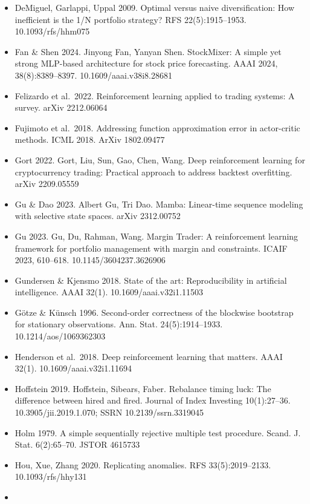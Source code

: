 \documentclass[12pt,a4paper]{report}
\begin{document}
\begin{itemize}
  Cuturi \& Blondel 2017. Soft-DTW: A differentiable loss function for
  time-series. ICML 2017, PMLR 70:894--903. arXiv 1703.01541
\item
  DeMiguel, Garlappi, Uppal 2009. Optimal versus naive diversification:
  How inefficient is the 1/N portfolio strategy? RFS 22(5):1915--1953.
  10.1093/rfs/hhm075
\item
  Fan \& Shen 2024. Jinyong Fan, Yanyan Shen. StockMixer: A simple yet
  strong MLP-based architecture for stock price forecasting. AAAI 2024,
  38(8):8389--8397. 10.1609/aaai.v38i8.28681
\item
  Felizardo et al.~2022. Reinforcement learning applied to trading
  systems: A survey. arXiv 2212.06064
\item
  Fujimoto et al.~2018. Addressing function approximation error in
  actor-critic methods. ICML 2018. ArXiv 1802.09477
\item
  Gort 2022. Gort, Liu, Sun, Gao, Chen, Wang. Deep reinforcement
  learning for cryptocurrency trading: Practical approach to address
  backtest overfitting. arXiv 2209.05559
\item
  Gu \& Dao 2023. Albert Gu, Tri Dao. Mamba: Linear-time sequence
  modeling with selective state spaces. arXiv 2312.00752
\item
  Gu 2023. Gu, Du, Rahman, Wang. Margin Trader: A reinforcement learning
  framework for portfolio management with margin and constraints. ICAIF
  2023, 610--618. 10.1145/3604237.3626906
\item
  Gundersen \& Kjensmo 2018. State of the art: Reproducibility in
  artificial intelligence. AAAI 32(1). 10.1609/aaai.v32i1.11503
\item
  Götze \& Künsch 1996. Second-order correctness of the blockwise
  bootstrap for stationary observations. Ann. Stat. 24(5):1914--1933.
  10.1214/aos/1069362303
\item
  Henderson et al.~2018. Deep reinforcement learning that matters. AAAI
  32(1). 10.1609/aaai.v32i1.11694
\item
  Hoffstein 2019. Hoffstein, Sibears, Faber. Rebalance timing luck: The
  difference between hired and fired. Journal of Index Investing
  10(1):27--36. 10.3905/jii.2019.1.070; SSRN 10.2139/ssrn.3319045
\item
  Holm 1979. A simple sequentially rejective multiple test procedure.
  Scand. J. Stat. 6(2):65--70. JSTOR 4615733
\item
  Hou, Xue, Zhang 2020. Replicating anomalies. RFS 33(5):2019--2133.
  10.1093/rfs/hhy131
\item

\end{itemize}
\end{document}
